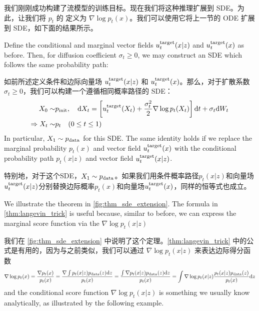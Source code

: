 我们刚刚成功构建了流模型的训练目标。现在我们将这种推理扩展到 SDE。为此，让我们将 $p_t$ 的  定义为 $\nabla\log p_t(x)$。我们可以使用它将上一节的 ODE 扩展到 SDE，如下面的结果所示。
\begin{theorem}
\label{thm:langevin_trick}
Define the conditional and marginal vector fields $u^{\text{target}}_t(x|z)$ and $u^{\text{target}}_t(x)$ as before. Then, for diffusion coefficient $\sigma_t\geq 0$, we may construct an SDE which follows the same probability path:

如前所述定义条件和边际向量场 $u^{\text{target}}_t(x|z)$ 和 $u^{\text{target}}_t(x)$。那么，对于扩散系数 $\sigma_t\geq 0$，我们可以构建一个遵循相同概率路径的 SDE：
\begin{align}
\label{eq:sde_extension}
    X_0\sim&p_{\rm{init}},\quad \mathrm{d} X_t =\left[u^{\text{target}}_t(X_t)+\frac{\sigma_t^2}{2}\nabla\log p_t(X_t)\right]\mathrm{d} t +\sigma_t\mathrm{d} W_t\\
    \label{eq:marginal_ode_follows_marginal_path_sde}
    \Rightarrow X_t\sim& p_t\quad (0\leq t\leq 1)
\end{align}
In particular, $X_1\sim p_{\rm{data}}$ for this SDE. The same identity holds if we replace the marginal probability $p_t(x)$ and vector field $u^{\text{target}}_t(x)$ with the conditional probability path $p_t(x|z)$ and vector field $u^{\text{target}}_t(x|z)$.

特别地，对于这个SDE，$X_1\sim p_{\rm{data}}$。如果我们用条件概率路径$p_t(x|z)$和向量场$u^{\text{target}}_t(x|z)$分别替换边际概率$p_t(x)$和向量场$u^{\text{target}}_t(x)$，同样的恒等式也成立。
\end{theorem}
We illustrate the theorem in \cref{fig:thm_sde_extension}. The formula in \cref{thm:langevin_trick} is useful because, similar to before, we can express the marginal score function via the  $\nabla\log p_t(x|z)$

我们在 \cref{fig:thm_sde_extension} 中说明了这个定理。\cref{thm:langevin_trick} 中的公式是有用的，因为与之前类似，我们可以通过  $\nabla\log p_t(x|z)$ 来表达边际得分函数
\begin{align}
\label{e:marginal_score}
\nabla\log p_t(x) = \frac{\nabla p_t(x)}{p_t(x)}
=\frac{\nabla \int p_t(x|z)p_{\rm{data}}(z)\mathrm{d} z}{p_t(x)}
=\frac{\int \nabla p_t(x|z)p_{\rm{data}}(z)\mathrm{d} z}{p_t(x)}
=\int \nabla \log p_t(x|z)\frac{ p_t(x|z)p_{\rm{data}}(z)}{p_t(x)}\mathrm{d} z
\end{align}
and the conditional score function $\nabla \log p_t(x|z)$ is something we usually know analytically, as illustrated by the following example.

